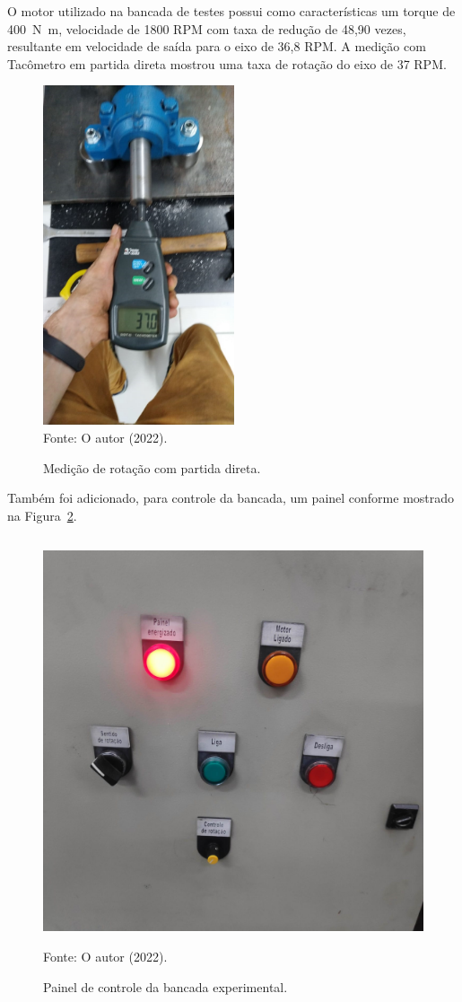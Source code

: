 \documentclass[
	12pt,				
	oneside,			
	a4paper,			
	english,			
	brazil,			
	]{abntex2ppgsi}
\begin{document}
O motor utilizado na bancada de testes possui como características um torque de \SI{400}{\newton\metre}, velocidade de 1800 RPM com taxa de redução de 48,90 vezes, resultante em velocidade de saída para o eixo de 36,8 RPM. A medição com Tacômetro em partida direta mostrou uma taxa de rotação do eixo de 37 RPM. 

\begin{figure}[H]
\centering
\caption {Medição de rotação com partida direta.}
\includegraphics[width=\textwidth,height=100mm,keepaspectratio]{tacometro_lucas} \\
Fonte: O autor (2022).
\label{tacometro_lucas}
\end{figure}
 
Também foi adicionado, para controle da bancada, um painel conforme mostrado na Figura~\ref{painel_bancada}. 

\begin{figure}[H]
\centering
\caption {Painel de controle da bancada experimental.}
\includegraphics[width=\textwidth,height=120mm,keepaspectratio]{painel_bancada} \\
Fonte: O autor (2022).
\label{painel_bancada}
\end{figure}
 
\end{document}
